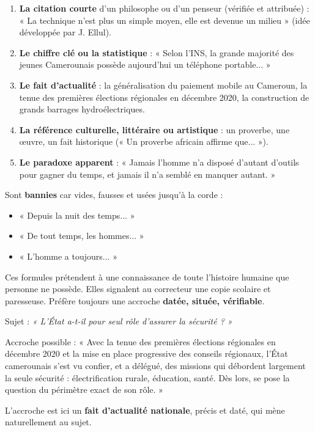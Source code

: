 \documentclass[11pt]{article}
\begin{document}
\begin{propriete}
\begin{enumerate}
\item \textbf{La citation courte} d'un philosophe ou d'un penseur (vérifiée et attribuée) : « La technique n'est plus un simple moyen, elle est devenue un milieu » (idée développée par J. Ellul).
\item \textbf{Le chiffre clé ou la statistique} : « Selon l'INS, la grande majorité des jeunes Camerounais possède aujourd'hui un téléphone portable... »
\item \textbf{Le fait d'actualité} : la généralisation du paiement mobile au Cameroun, la tenue des premières élections régionales en décembre 2020, la construction de grands barrages hydroélectriques.
\item \textbf{La référence culturelle, littéraire ou artistique} : un proverbe, une œuvre, un fait historique (« Un proverbe africain affirme que... »).
\item \textbf{Le paradoxe apparent} : « Jamais l'homme n'a disposé d'autant d'outils pour gagner du temps, et jamais il n'a semblé en manquer autant. »
\end{enumerate}
\end{propriete}

\begin{attention}
Sont \textbf{bannies} car vides, fausses et usées jusqu'à la corde :
\begin{itemize}
\item « Depuis la nuit des temps... »
\item « De tout temps, les hommes... »
\item « L'homme a toujours... »
\end{itemize}
Ces formules prétendent à une connaissance de toute l'histoire humaine que personne ne possède. Elles signalent au correcteur une copie scolaire et paresseuse. Préfère toujours une accroche \textbf{datée, située, vérifiable}.
\end{attention}

\begin{exemplebox}
Sujet : \emph{« L'État a-t-il pour seul rôle d'assurer la sécurité ? »}

Accroche possible : « Avec la tenue des premières élections régionales en décembre 2020 et la mise en place progressive des conseils régionaux, l'État camerounais s'est vu confier, et a délégué, des missions qui débordent largement la seule sécurité : électrification rurale, éducation, santé. Dès lors, se pose la question du périmètre exact de son rôle. »

L'accroche est ici un \textbf{fait d'actualité nationale}, précis et daté, qui mène naturellement au sujet.
\end{exemplebox}
\end{document}
